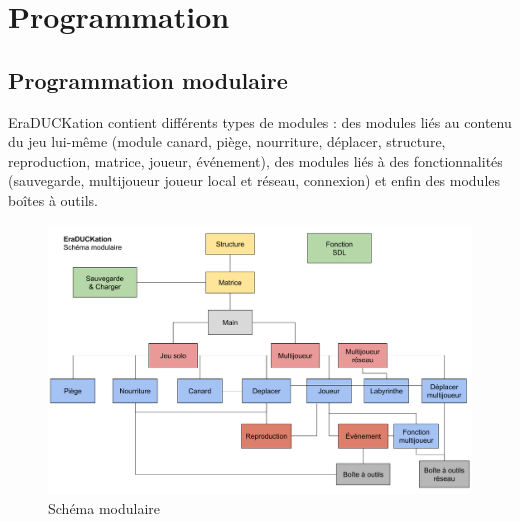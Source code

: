 \documentclass[12pt,a4paper,twoside]{article}
\begin{document}
\section{Programmation}
\subsection{Programmation modulaire}
EraDUCKation contient différents types de modules : des modules liés au contenu du jeu lui-même (module canard, piège, nourriture, déplacer, structure, reproduction, matrice, joueur, événement), des modules liés à des fonctionnalités (sauvegarde, multijoueur joueur local et réseau, connexion) et enfin des modules boîtes à outils.
\begin{figure}[h]
\centering
\includegraphics[width=1\textwidth]{IMG/module.png}
\caption{Schéma modulaire}
\end{figure}
\end{document}

